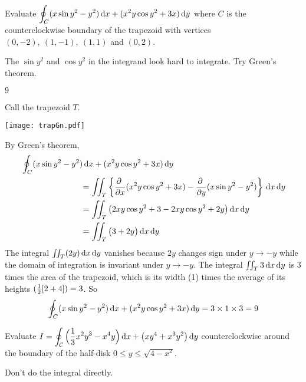 \begin{question}
Evaluate
 $\displaystyle\oint_C (x\sin y^2 -y^2)\,\mathrm{d}x+(x^2y\cos y^2+3x)\,\mathrm{d}y$ 
where $C$ is the
counterclockwise boundary of the trapezoid with vertices $(0,-2),\ (1,-1),\
(1,1)$ and $(0,2)$.
\end{question}

\begin{hint} 
The $\sin y^2$ and $\cos y^2$ in the integrand look hard to integrate.
Try Green's theorem.
\end{hint}

\begin{answer} 
$9$
\end{answer}

\begin{solution} 
Call the trapezoid $T$. 
\begin{center}
       \texttt{[image: trapGn.pdf]}
\end{center}
By Green's theorem,
\begin{align*}
&\oint_C (x\sin y^2 -y^2)\,\dee{x}+(x^2y\cos y^2+3x)\,\dee{y} \\
&\hskip1in=\dblInt_T\left\{\pdiff{}{x}(x^2y\cos y^2+3x)
-\pdiff{}{y} (x\sin y^2 -y^2)\right\}\,\dee{x}\,\dee{y}\\
&\hskip1in=\dblInt_T\big(2xy\cos y^2+3-2xy\cos y^2+2y\big)\,\dee{x}\,\dee{y}\\
&\hskip1in=\dblInt_T\big(3+2y\big)\,\dee{x}\,\dee{y}
\end{align*}
The integral $\iint_T(2y)\,\mathrm{d}x\,\mathrm{d}y$ vanishes because $2y$ changes
sign under $y\rightarrow-y$ while the domain of 
integration is invariant under $y\rightarrow -y$.  The integral 
$\iint_T 3\,\mathrm{d}x\,\mathrm{d}y$ is $3$ times the area of the
trapezoid, which is its width (1) times the average of its heights
$(\tfrac{1}{2}[2+4])=3$. So 
\begin{equation*}
\oint_C (x\sin y^2 -y^2)\,\mathrm{d}x+(x^2y\cos y^2+3x)\,\mathrm{d}y
               =3\times 1\times 3 = 9
\end{equation*}
\end{solution}

\begin{question}[M317 1999A] %
 Evaluate 
$ I=
\displaystyle\oint_{\mathcal{C}} \Big(\frac{1}{3}x^2y^3-x^4y\Big)\,\mathrm{d}x
+\big(xy^4+x^3y^2\big)\,\mathrm{d}y
$
counterclockwise around the boundary of the half-disk $0\le y\le \sqrt{4-x^2}$.
\end{question}

\begin{hint} 
Don't do the integral directly. 
\end{hint}

